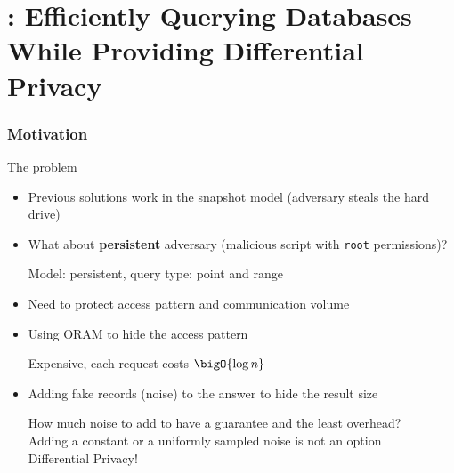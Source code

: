 \section{\epsolute{}: Efficiently Querying Databases While Providing Differential Privacy~\cite{epsolute}}

	\begin{frame}[label={frame:epsolute-motivation}]

		\frametitle{Motivation}

		\begin{block}{The problem}

			\begin{itemize}
				\item<1-> Previous solutions work in the snapshot model (adversary steals the hard drive)
				\item<1->
					What about \textbf{persistent} adversary (malicious script with \texttt{root} permissions)? \\
					\begin{small}
						Model: \alert{persistent}, query type: \alert{point} and \alert{range}
					\end{small}
				\item<1-> Need to protect \alert{access pattern} and \alert{communication volume}
				\item<2->
					Using ORAM to hide the access pattern \\
					\begin{small}
						Expensive, each request costs $\bigO{\log n}$ \hyperlink{frame:appendix:oram}{}
					\end{small}
				\item<3->
					Adding fake records (noise) to the answer to hide the result size \\
					\begin{small}
						How much noise to add to have a guarantee and the least overhead? \\
						Adding a constant or a uniformly sampled noise is not an option \\
						Differential Privacy!
					\end{small}
			\end{itemize}

		\end{block}

	\end{frame}

